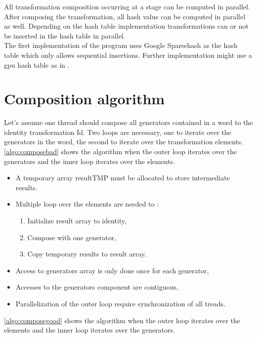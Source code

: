 {All transformation composition occurring at a stage can be computed in parallel. After composing the transformation, all hash value can be computed in parallel as well. Depending on the hash table implementation transformations can or not be inserted in the hash table in parallel.\\
The first implementation of the program uses Google Sparsehash as the hash table which only allows sequential insertions. Further implementation might use a \gls{gpu} hash table as in \cite{wen2011gpu}.


\section{Composition algorithm}
Let's assume one thread should compose all generators contained in a word to the identity transformation Id. Two loops are necessary, one to iterate over the generators in the word, the second to iterate over the transformation elements.
\autoref{algo:composebad} shows the algorithm when the outer loop iterates over the generators and the inner loop iterates over the elements.
\begin{itemize}
\item A temporary array resultTMP must be allocated to store intermediate results.
\item Multiple loop over the elements are needed to :
\begin{enumerate}
 \item Initialize result array to identity,
 \item Compose with one generator,
 \item Copy temporary results to result array.
 \end{enumerate}
\item Access to generators array is only done once for each generator,
 \item Accesses to the generators component are contiguous,
 \item Parallelization of the outer loop require synchronization of all treads.
\end{itemize}
\autoref{algo:composegood} shows the algorithm when the outer loop iterates over the elements and the inner loop iterates over the generators.
\begin{itemize}

\end{itemize}}
